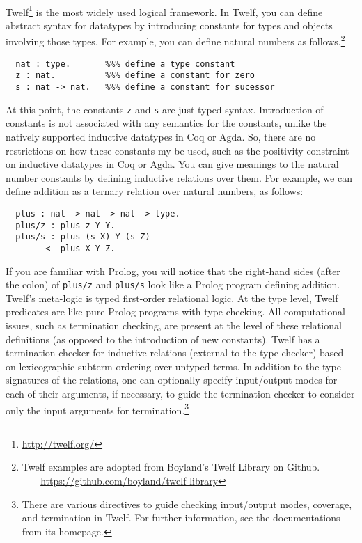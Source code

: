 \paragraph{}
Twelf\footnote{\url{http://twelf.org/}} is the most widely used
logical framework. In Twelf, you can define abstract syntax for datatypes
by introducing constants for types and objects involving those types.
For example, you can define natural numbers as follows.\footnote{
        Twelf examples are adopted from Boyland's Twelf Library on Github.\\
        $~~~~~~~$
        \url{https://github.com/boyland/twelf-library}}\vspace*{-2em}
\begin{singlespace}
\begin{verbatim}
  nat : type.       %%% define a type constant
  z : nat.          %%% define a constant for zero
  s : nat -> nat.   %%% define a constant for sucessor
\end{verbatim}
\end{singlespace}\noindent
At this point, the constants \texttt{z} and \texttt{s} are just typed syntax.
Introduction of constants is not associated with any semantics for
the constants, unlike the natively supported
inductive datatypes in Coq or Agda. So, there are no restrictions
on how these constants my be used, such as the positivity constraint on
inductive datatypes in Coq or Agda.
You can give meanings to the natural number constants by defining
inductive relations over them. For example, we can define addition
as a ternary relation over natural numbers, as follows:\vspace*{-2em}
\begin{singlespace}
\begin{verbatim}
  plus : nat -> nat -> nat -> type.
  plus/z : plus z Y Y.
  plus/s : plus (s X) Y (s Z)
        <- plus X Y Z.
\end{verbatim}
\end{singlespace}\noindent
If you are familiar with Prolog, you will notice that the
right-hand sides (after the colon) of \verb|plus/z| and \verb|plus/s|
look like a Prolog program defining addition. Twelf's meta-logic
is typed first-order relational logic.  At the type level, 
Twelf predicates are like pure Prolog programs with type-checking.
All computational issues,
such as termination checking, are present at the level of these
relational definitions (as opposed to the introduction of new constants).
Twelf has a termination checker
for inductive relations  (external to the type checker)
based on lexicographic subterm ordering over untyped terms.
In addition to the type signatures of the relations, one can optionally specify
input/output modes for each of their arguments, if necessary, to guide
the termination checker to consider only the input arguments
for termination.\footnote{There are various directives to guide
        checking input/output modes, coverage, and termination in Twelf.
        For further information, see the  documentations from its homepage.}

